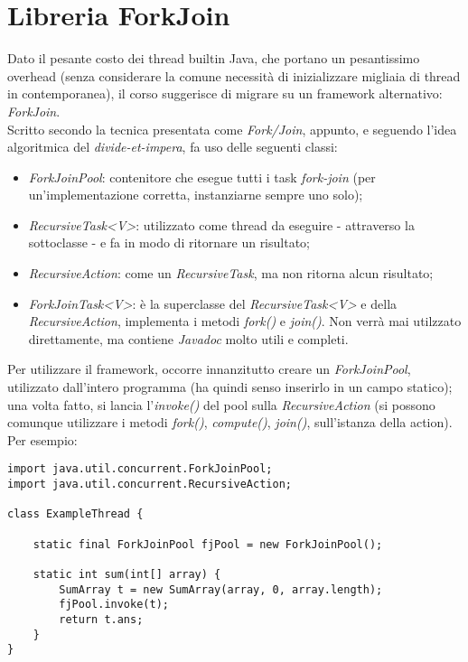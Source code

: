 \section{Libreria ForkJoin}
Dato il pesante costo dei thread builtin Java, che portano un pesantissimo overhead (senza considerare la comune necessità di inizializzare migliaia di thread in contemporanea), il corso suggerisce di migrare su un framework alternativo: \textit{ForkJoin}. \\
Scritto secondo la tecnica presentata come \textit{Fork/Join}, appunto, e seguendo l'idea algoritmica del \textit{divide-et-impera}, fa uso delle seguenti classi:
\begin{itemize}
	\item \textit{ForkJoinPool}: contenitore che esegue tutti i task \textit{fork-join} (per un'implementazione corretta, instanziarne sempre uno solo);
	\item \textit{RecursiveTask<V>}: utilizzato come thread da eseguire - attraverso la sottoclasse - e fa in modo di ritornare un risultato;
	\item \textit{RecursiveAction}: come un \textit{RecursiveTask}, ma non ritorna alcun risultato;
	\item \textit{ForkJoinTask<V>}: è la superclasse del \textit{RecursiveTask<V>} e della \textit{RecursiveAction}, implementa i metodi \textit{fork()} e \textit{join()}. Non verrà mai utilzzato direttamente, ma contiene \textit{Javadoc} molto utili e completi.
\end{itemize}

Per utilizzare il framework, occorre innanzitutto creare un \textit{ForkJoinPool}, utilizzato dall'intero programma (ha quindi senso inserirlo in un campo statico); una volta fatto, si lancia l'\textit{invoke()} del pool sulla \textit{RecursiveAction} (si possono comunque utilizzare i metodi \textit{fork()}, \textit{compute()}, \textit{join()}, sull'istanza della action). \\
Per esempio:
\begin{lstlisting}
import java.util.concurrent.ForkJoinPool;
import java.util.concurrent.RecursiveAction;

class ExampleThread {

	static final ForkJoinPool fjPool = new ForkJoinPool();

	static int sum(int[] array) {
		SumArray t = new SumArray(array, 0, array.length);
		fjPool.invoke(t);
		return t.ans;
	}
}
\end{lstlisting}

